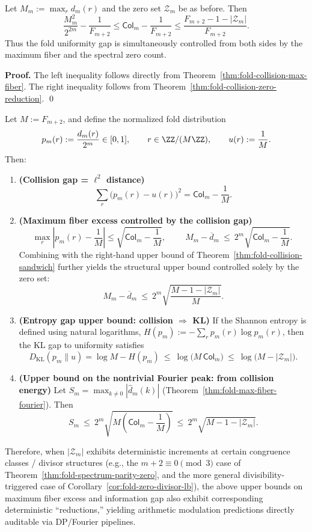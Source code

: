 \begin{theorem}
\label{thm:fold-collision-sandwich}
Let $M_m:=\max_r d_m(r)$ and the zero set $\mathcal{Z}_m$ be as before. Then
\[
\frac{M_m^2}{2^{2m}}-\frac{1}{F_{m+2}}
\le
\mathsf{Col}_m-\frac{1}{F_{m+2}}
\le
\frac{F_{m+2}-1-|\mathcal{Z}_m|}{F_{m+2}}.
\]
Thus the fold uniformity gap is simultaneously controlled from both sides by the maximum fiber and the spectral zero count.
\end{theorem}

\textbf{Proof.}
The left inequality follows directly from Theorem~\ref{thm:fold-collision-max-fiber}.
The right inequality follows from Theorem~\ref{thm:fold-collision-zero-reduction}. \qed

\begin{theorem}\label{thm:fold-zero-uncertainty}
Let \(M:=F_{m+2}\), and define the normalized fold distribution
\[
p_m(r):=\frac{d_m(r)}{2^m}\in[0,1],\qquad r\in\ZZ/(M\ZZ),
\qquad
u(r):=\frac{1}{M}.
\]
Then:
\begin{enumerate}
  \item \textbf{(Collision gap = \(\ell^2\) distance)}
  \[
  \boxed{\;\sum_{r}\bigl(p_m(r)-u(r)\bigr)^2=\mathsf{Col}_m-\frac{1}{M}.\;}
  \]
  \item \textbf{(Maximum fiber excess controlled by the collision gap)}
  \[
  \max_r\left|p_m(r)-\frac1M\right|
  \le \sqrt{\mathsf{Col}_m-\frac{1}{M}},
  \qquad
  \boxed{\;
  M_m-\overline d_m\ \le\ 2^m\sqrt{\mathsf{Col}_m-\frac{1}{M}}.\;}
  \]
  Combining with the right-hand upper bound of Theorem~\ref{thm:fold-collision-sandwich} further yields the structural upper bound controlled solely by the zero set:
  \[
  \boxed{\;
  M_m-\overline d_m\ \le\ 2^m\sqrt{\frac{M-1-|\mathcal{Z}_m|}{M}}. \;}
  \]
  \item \textbf{(Entropy gap upper bound: collision \(\Rightarrow\) KL)}
  If the Shannon entropy is defined using natural logarithms, \(H(p_m):=-\sum_r p_m(r)\log p_m(r)\), then the KL gap to uniformity satisfies
  \[
  D_{\mathrm{KL}}(p_m\|u)=\log M-H(p_m)\ \le\ \log\!\bigl(M\,\mathsf{Col}_m\bigr)\ \le\ \log\!\bigl(M-|\mathcal{Z}_m|\bigr).
  \]
  \item \textbf{(Upper bound on the nontrivial Fourier peak: from collision energy)}
  Let \(S_m=\max_{k\ne 0}|\widehat d_m(k)|\) (Theorem~\ref{thm:fold-max-fiber-fourier}). Then
  \[
  \boxed{\;
  S_m\ \le\ 2^m\sqrt{M\left(\mathsf{Col}_m-\frac{1}{M}\right)}\ \le\ 2^m\sqrt{M-1-|\mathcal{Z}_m|}. \;}
  \]
\end{enumerate}
Therefore, when \(|\mathcal{Z}_m|\) exhibits deterministic increments at certain congruence classes / divisor structures (e.g., the \(m+2\equiv 0\pmod 3\) case of Theorem~\ref{thm:fold-spectrum-parity-zero}, and the more general divisibility-triggered case of Corollary~\ref{cor:fold-zero-divisor-lb}), the above upper bounds on maximum fiber excess and information gap also exhibit corresponding deterministic ``reductions,'' yielding arithmetic modulation predictions directly auditable via DP/Fourier pipelines.
\end{theorem}
